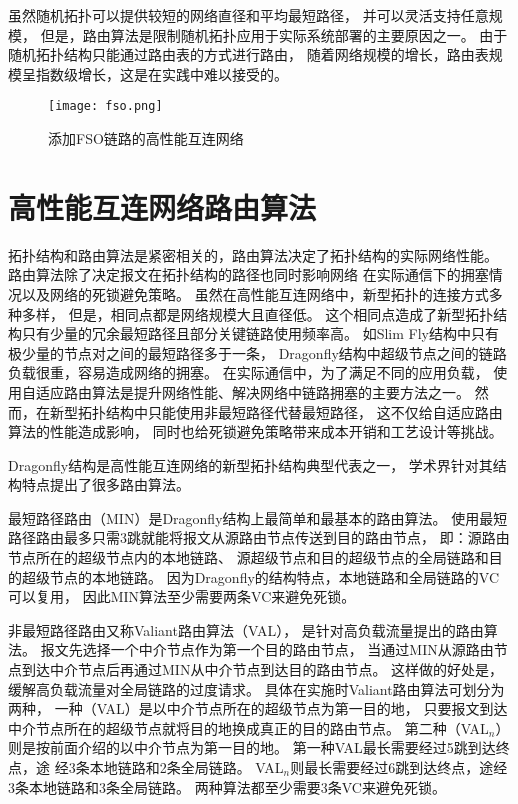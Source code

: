 虽然随机拓扑可以提供较短的网络直径和平均最短路径，
并可以灵活支持任意规模，
但是，路由算法是限制随机拓扑应用于实际系统部署的主要原因之一。
由于随机拓扑结构只能通过路由表的方式进行路由，
随着网络规模的增长，路由表规模呈指数级增长，这是在实践中难以接受的。

\begin{figure}[htp]
\centering
\texttt{[image: fso.png]}
\caption{添加FSO链路的高性能互连网络}
\label{fso}
\end{figure}

\section{高性能互连网络路由算法}

拓扑结构和路由算法是紧密相关的，路由算法决定了拓扑结构的实际网络性能。
路由算法除了决定报文在拓扑结构的路径也同时影响网络
在实际通信下的拥塞情况以及网络的死锁避免策略。
虽然在高性能互连网络中，新型拓扑的连接方式多种多样，
但是，相同点都是网络规模大且直径低。
这个相同点造成了新型拓扑结构只有少量的冗余最短路径且部分关键链路使用频率高。
如Slim Fly结构中只有
极少量的节点对之间的最短路径多于一条，
Dragonfly结构中超级节点之间的链路负载很重，容易造成网络的拥塞。
在实际通信中，为了满足不同的应用负载，
使用自适应路由算法是提升网络性能、解决网络中链路拥塞的主要方法之一。
然而，在新型拓扑结构中只能使用非最短路径代替最短路径，
这不仅给自适应路由算法的性能造成影响，
同时也给死锁避免策略带来成本开销和工艺设计等挑战。

Dragonfly结构是高性能互连网络的新型拓扑结构典型代表之一，
学术界针对其结构特点提出了很多路由算法。

最短路径路由（MIN）是Dragonfly结构上最简单和最基本的路由算法。
使用最短路径路由最多只需3跳就能将报文从源路由节点传送到目的路由节点，
即：源路由节点所在的超级节点内的本地链路、
源超级节点和目的超级节点的全局链路和目的超级节点的本地链路。
因为Dragonfly的结构特点，本地链路和全局链路的VC可以复用，
因此MIN算法至少需要两条VC来避免死锁。

非最短路径路由又称Valiant路由算法（VAL），
是针对高负载流量提出的路由算法。
报文先选择一个中介节点作为第一个目的路由节点，
当通过MIN从源路由节点到达中介节点后再通过MIN从中介节点到达目的路由节点。
这样做的好处是，缓解高负载流量对全局链路的过度请求。
具体在实施时Valiant路由算法可划分为两种，
一种（VAL）是以中介节点所在的超级节点为第一目的地，
只要报文到达中介节点所在的超级节点就将目的地换成真正的目的路由节点。
第二种（VAL$_n$）则是按前面介绍的以中介节点为第一目的地。
第一种VAL最长需要经过5跳到达终点，途
经3条本地链路和2条全局链路。
VAL$_n$则最长需要经过6跳到达终点，途经3条本地链路和3条全局链路。
两种算法都至少需要3条VC来避免死锁。


